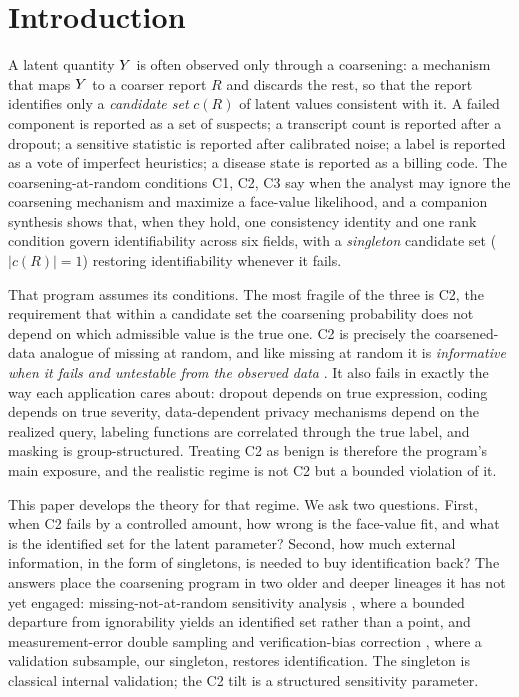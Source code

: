 \section{Introduction}
\label{sec:intro}

A latent quantity $Y$ is often observed only through a coarsening: a mechanism
that maps $Y$ to a coarser report $R$ and discards the rest, so that the report
identifies only a \emph{candidate set} $c(R)$ of latent values consistent with it.
A failed component is reported as a set of suspects; a transcript count is reported
after a dropout; a sensitive statistic is reported after calibrated noise; a label
is reported as a vote of imperfect heuristics; a disease state is reported as a
billing code. The coarsening-at-random conditions C1, C2, C3
\citep{heitjan1991ignorability,gill1997coarsening,little2002statistical} say when
the analyst may ignore the coarsening mechanism and maximize a face-value
likelihood, and a companion synthesis \citep{towell2026synthesis} shows that, when
they hold, one consistency identity and one rank condition govern identifiability
across six fields, with a \emph{singleton} candidate set ($|c(R)| = 1$) restoring
identifiability whenever it fails.

That program assumes its conditions. The most fragile of the three is C2, the
requirement that within a candidate set the coarsening probability does not depend
on which admissible value is the true one. C2 is precisely the
coarsened-data analogue of missing at random, and like missing at random it is
\emph{informative when it fails and untestable from the observed data}
\citep{grunwald2003updating,jaeger2005ignorability}. It also fails in exactly the
way each application cares about: dropout depends on true expression, coding depends
on true severity, data-dependent privacy mechanisms depend on the realized query,
labeling functions are correlated through the true label, and masking is
group-structured. Treating C2 as benign is therefore the program's main exposure,
and the realistic regime is not C2 but a bounded violation of it.

This paper develops the theory for that regime. We ask two questions. First, when
C2 fails by a controlled amount, how wrong is the face-value fit, and what is the
identified set for the latent parameter? Second, how much external information, in
the form of singletons, is needed to buy identification back? The answers place the
coarsening program in two older and deeper lineages it has not yet engaged:
missing-not-at-random sensitivity analysis
\citep{copas1997inference,manski1989anatomy,molenberghs2008every,daniels2008missing},
where a bounded departure from ignorability yields an identified set rather than a
point, and measurement-error double sampling and verification-bias correction
\citep{tenenbein1970double,begg1983assessment,carroll2006measurement}, where a
validation subsample, our singleton, restores identification. The singleton is
classical internal validation; the C2 tilt is a structured sensitivity parameter.

